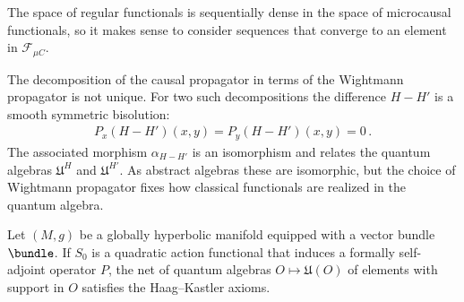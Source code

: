    The space of regular functionals is sequentially dense in the space of microcausal functionals, so it makes sense to consider sequences that converge to an element in $\mathcal{F}_{\mu C}$.
    \begin{remark}
        The decomposition of the causal propagator in terms of the Wightmann propagator is not unique. For two such decompositions the difference $H-H'$ is a smooth symmetric bisolution:
        \begin{gather}
            P_x(H-H')(x,y) = P_y(H-H')(x,y)=0\,.
        \end{gather}
        The associated morphism $\alpha_{H-H'}$ is an isomorphism and relates the quantum algebras $\mathfrak{U}^H$ and $\mathfrak{U}^{H'}$. As abstract algebras these are isomorphic, but the choice of Wightmann propagator fixes how classical functionals are realized in the quantum algebra.
    \end{remark}

    \begin{property}
        Let $(M,g)$ be a globally hyperbolic manifold equipped with a vector bundle $\bundle$. If $S_0$ is a quadratic action functional that induces a formally self-adjoint operator $P$, the net of quantum algebras $O\mapsto\mathfrak{U}(O)$ of elements with support in $O$ satisfies the Haag--Kastler axioms.
    \end{property}

